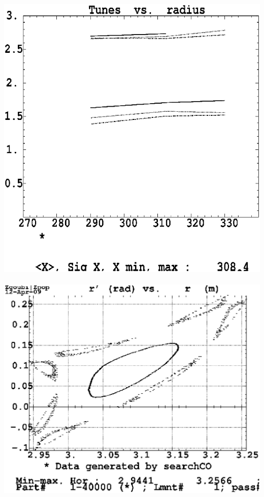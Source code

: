 \documentclass[12pt]{article}
\newcommand{\nib}{\noindent \ensuremath{\bullet~}}
\newcommand{\blue}{\color{blue}}
\begin{document}
{{\begin{minipage}{.6\linewidth}
\begin{minipage}{.99\linewidth}
\begin{minipage}{.5\linewidth}
\hspace{-0ex}
\mbox{
 \includegraphics*[width=.8\linewidth]{./figs_FFAG_introSlides/raccamTunes.eps}
 \includegraphics*[bbllx=20,bblly=20,bburx=567,bbury=457,width=.9\linewidth]{./figs_FFAG_introSlides/raccamDA.eps}
}

\end{minipage}
\end{minipage}
\end{minipage}
}



}
\end{document}
